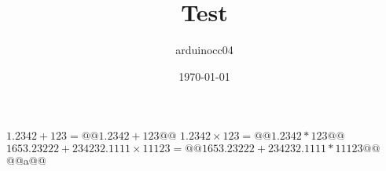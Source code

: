 \documentclass[chapter, a4paper]{oblivoir}
\author{arduinocc04}
\date{\today}
\title{Test}
\begin{document}
    \maketitle
    $1.2342 + 123 = @@1.2342 + 123@@$
    $1.2342 \times 123 = @@1.2342*123@@$
    $1653.23222 + 234232.1111 \times 11123 = @@1653.23222 + 234232.1111 * 11123@@$%
    @@a@@
\end{document}
